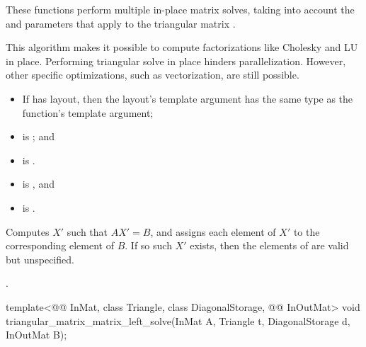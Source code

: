 \begin{itemdescr}
\pnum
These functions perform multiple in-place matrix solves,
taking into account the  and  parameters
that apply to the triangular matrix .
\begin{note}
This algorithm makes it possible
to compute factorizations like Cholesky and LU in place.
Performing triangular solve in place hinders parallelization.
However, other  specific optimizations,
such as vectorization, are still possible.
\end{note}

\pnum
\mandates
\begin{itemize}
\item
If  has  layout,
then the layout's  template argument has
the same type as the function's  template argument;
\item
{}
is ; and
\item
{}
is .
\end{itemize}

\pnum
\expects
\begin{itemize}
\item
{} is , and
\item
{} is .
\end{itemize}

\pnum
\effects
Computes $X'$ such that $AX' = B$,
and assigns each element of $X'$ to the corresponding element of $B$.
If so such $X'$ exists,
then the elements of  are valid but unspecified.

\pnum
\complexity
{}.
\end{itemdescr}

%
\begin{itemdecl}
template<@@ InMat, class Triangle, class DiagonalStorage, @@ InOutMat>
  void triangular_matrix_matrix_left_solve(InMat A, Triangle t, DiagonalStorage d,
                                           InOutMat B);
\end{itemdecl}

